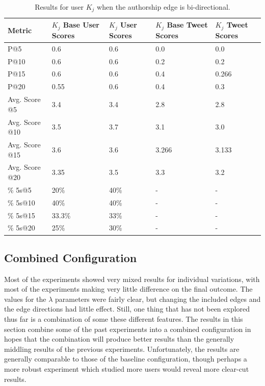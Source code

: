 \begin{table}
\centering
\begin{tabular}{l|p{2.2cm}|p{2.2cm}|p{2.2cm}|p{2.2cm}}
{\bf Metric} & {\bf $K_{j}$ Base User Scores} & {\bf $K_{j}$ User Scores} & {\bf $K_{j}$ Base Tweet Scores} & {\bf $K_{j}$ Tweet Scores} \\ \hline
P@5   & 0.6 & 0.6 & 0.0 & 0.0 \\ \hline
P@10 & 0.6 & 0.6 & 0.2 & 0.2 \\ \hline
P@15 & 0.6 & 0.6 & 0.4 & 0.266 \\ \hline
P@20 & 0.55 & 0.6 & 0.4 & 0.3 \\ \hline

Avg. Score @5   & 3.4 & 3.4 & 2.8 & 2.8 \\ \hline
Avg. Score @10 & 3.5 & 3.7 & 3.1 & 3.0 \\ \hline
Avg. Score @15 & 3.6 & 3.6 & 3.266 & 3.133 \\ \hline
Avg. Score @20 & 3.35 & 3.5 & 3.3 & 3.2 \\ \hline

\% 5s@5    & 20\% & 40\% & - & - \\ \hline
\% 5s@10  & 40\% & 40\% & - & - \\ \hline
\% 5s@15  & 33.3\% & 33\% & - & - \\ \hline
\% 5s@20  & 25\% & 30\% & - & - \\

\end{tabular}
\caption{Results for user $K_{j}$ when the authorship edge is bi-directional.}
\label{tab:BiDirectionalAuthorKj}
\end{table}



\subsection{Combined Configuration}
\label{sec:CombinedConfiguration}

Most of the experiments showed very mixed results for individual variations, with most of the experiments making very little difference on the final outcome. The values for the $\lambda$ parameters were fairly clear, but changing the included edges and the edge directions had little effect. Still, one thing that has not been explored thus far is a combination of some these different features. The results in this section combine some of the past experiments into a combined configuration in hopes that the combination will produce better results than the generally middling results of the previous experiments. Unfortunately, the results are generally comparable to those of the baseline configuration, though perhaps a more robust experiment which studied more users would reveal more clear-cut results.

